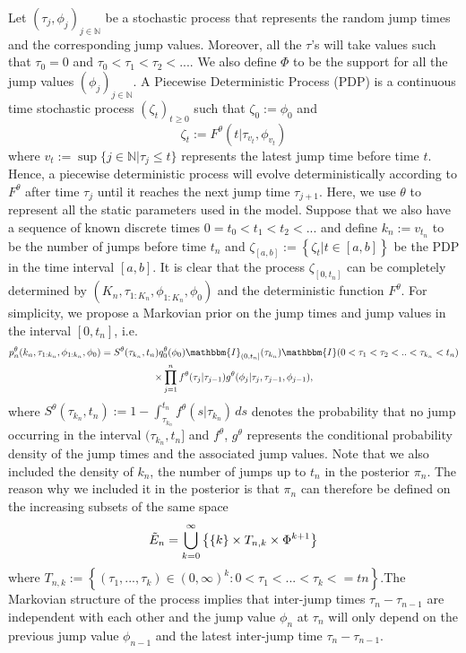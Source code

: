 \documentclass[12pt,a4paper]{article}
\begin{document}
Let $(\tau_j,\phi_j)_{j \in \mathbb{N}}$ be a stochastic process that represents the random jump times and the corresponding jump values. Moreover, all the $\tau$'s will take values such that $\tau_0 = 0$ and $\tau_0<\tau_1<\tau_2<...$. We also define $\Phi$ to be the support for all the jump values $(\phi_j)_{j \in \mathbb{N}}$. A Piecewise Deterministic Process (PDP) is a continuous time stochastic process $(\zeta_t)_{t \geq 0}$ such that $\zeta_0 := \phi_0$ and 
$$\zeta_t := F^{\theta}(t|\tau_{v_t},\phi_{v_t})$$
where $v_t := \sup \{j \in \mathbb{N}|\tau_j \leq t \}$ represents the latest jump time before time $t$. Hence, a piecewise deterministic process will evolve deterministically according to $F^{\theta}$ after time $\tau_{j}$ until it reaches the next jump time $\tau_{j+1}$. Here, we use $\theta$ to represent all the static parameters used in the model. Suppose that we also have a sequence of known discrete times $0=t_0<t_1<t_2<...$ and define $k_n := v_{t_n}$ to be the number of jumps before time $t_n$  and \(\zeta_{[a,b]} := \left\{\zeta_t| t \in [a,b]\right\}\) be the PDP in the time interval \([a,b]\). It is clear that the process $\zeta_{[0,t_n]}$ can be completely determined by $\left(K_n,\tau_{1:K_n},\phi_{1:K_n},\phi_0\right)$ and the deterministic function \(F^{\theta}\). For simplicity, we propose a Markovian prior on the jump times and jump values in the interval $[0,t_n]$, i.e.
\begin{multline}
\label{eqn:Chap1-PDMP-Prior}
    p_n^{\theta}(k_n,\tau_{1:k_n},\phi_{1:k_n},\phi_0) = S^{\theta}(\tau_{k_n},t_n)q_0^{\theta}(\phi_0)\mathbbm{I}_{(0,t_n]}(\tau_{k_n})\mathbbm{I}(0 < \tau_1 < \tau_2 <.. <\tau_{k_n} < t_n)\\
    \times \prod_{j=1}^{n} f^{\theta}(\tau_j|\tau_{j-1}) g^{\theta}(\phi_j|\tau_j,\tau_{j-1},\phi_{j-1}),
\end{multline}
where \(S^{\theta}(\tau_{k_n},t_n):= 1- \int_{\tau_{k_n}}^{t_n} f^{\theta}(s|\tau_{k_n})\,ds\) denotes the probability that no jump occurring in the interval $(\tau_{k_n},t_n]$ and $f^{\theta}$, $g^{\theta}$ represents the conditional probability density of the jump times and the associated jump values. Note that we also included the density of $k_n$, the number of jumps up to $t_n$ in the posterior $\pi_n$. The reason why we included it in the posterior is that $\pi_n$ can therefore be defined on the increasing subsets of the same space 
\begin{equation*}
    \Tilde{E}_n = \bigcup_{k=0}^{\infty} \left\{\{k\}\times T_{n,k} \times \Phi^{k+1}\right\}
\end{equation*}
where $T_{n,k} := \left\{(\tau_1,...,\tau_k) \in (0,\infty)^k : 0 < \tau_1 <...< \tau_k <= tn\right\}$.The Markovian structure of the process implies that inter-jump times $\tau_n - \tau_{n-1}$ are independent with each other and the jump value $\phi_n$ at $\tau_n$ will only depend on the previous jump value $\phi_{n-1}$ and the latest inter-jump time $\tau_n - \tau_{n-1}$.
\end{document}
